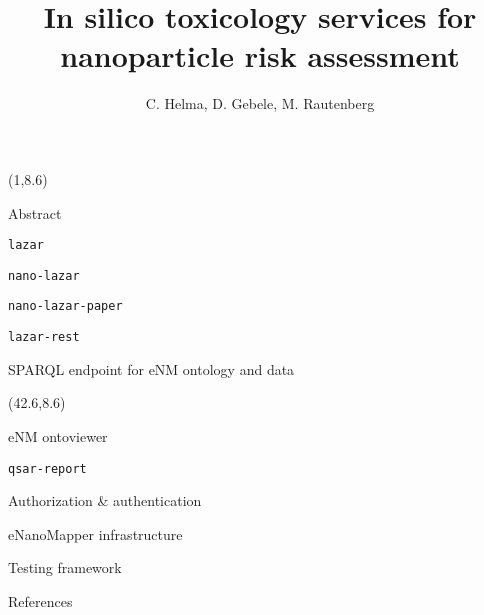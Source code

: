\documentclass[final]{beamer}
\title{In silico toxicology services for nanoparticle risk assessment}
\author{C. Helma, D. Gebele, M. Rautenberg}
\institute{\emph{in silico} toxicology gmbh, Basel, Switzerland}
\begin{document}
  \begin{frame}{}

    \begin{textblock}{40.5}(1,8.6)
      \begin{block}{Abstract}
        
      \end{block}

      \begin{block}{\tt{lazar}}
        
      \end{block}

      \begin{block}{\tt{nano-lazar}}
        
      \end{block}

      \begin{block}{\tt{nano-lazar}-paper}
        
      \end{block}

      \begin{block}{\tt{lazar-rest}}
        
      \end{block}

      \begin{block}{SPARQL endpoint for eNM ontology and data}
        
      \end{block}

    \end{textblock}

    \begin{textblock}{40.5}(42.6,8.6)

      \begin{block}{eNM ontoviewer}
        
      \end{block}

      \begin{block}{\tt{qsar-report}}
        
      \end{block}

      \begin{block}{Authorization \& authentication}
        
      \end{block}

      \begin{block}{eNanoMapper infrastructure}
        
      \end{block}

      \begin{block}{Testing framework}
        
      \end{block}

      \begin{block}{References}
        \small
      \end{block}

    \end{textblock}

  \end{frame}
\end{document}
